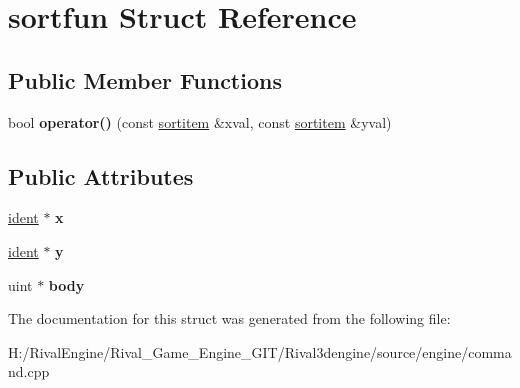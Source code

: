 \hypertarget{structsortfun}{}\section{sortfun Struct Reference}
\label{structsortfun}
\subsection*{Public Member Functions}
\begin{DoxyCompactItemize}
\item 
\mbox{\label{structsortfun_aa8d6698e66175b1bd871ab4eae4eb0a6}} 
bool {\bfseries operator()} (const \hyperlink{structsortitem}{sortitem} \&xval, const \hyperlink{structsortitem}{sortitem} \&yval)
\end{DoxyCompactItemize}
\subsection*{Public Attributes}
\begin{DoxyCompactItemize}
\item 
\mbox{\label{structsortfun_ac0c18320728f6cbe0c0e9749af62ca89}} 
\hyperlink{structident}{ident} $\ast$ {\bfseries x}
\item 
\mbox{\label{structsortfun_a7842b307027ccc51180f0f5f30beef0c}} 
\hyperlink{structident}{ident} $\ast$ {\bfseries y}
\item 
\mbox{\label{structsortfun_a8de022c668dcb1e2ead00b94f2fe167a}} 
uint $\ast$ {\bfseries body}
\end{DoxyCompactItemize}


The documentation for this struct was generated from the following file\+:\begin{DoxyCompactItemize}
\item 
H\+:/\+Rival\+Engine/\+Rival\+\_\+\+Game\+\_\+\+Engine\+\_\+\+G\+I\+T/\+Rival3dengine/source/engine/command.\+cpp\end{DoxyCompactItemize}
